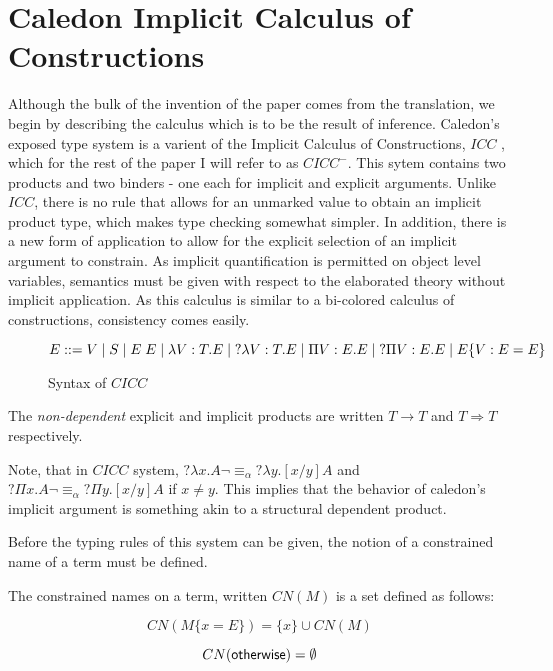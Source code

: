 \section{Caledon Implicit Calculus of Constructions}

Although the bulk of the invention of the paper comes from the translation, 
we begin by describing the calculus which is to be the result of inference.
Caledon's exposed type system is a varient of the Implicit Calculus of Constructions, $ICC$ \citep{miquel2001implicit}, 
which for the rest of the paper I will refer to as $CICC^{-}$.  
This sytem contains two products and two binders - one each for implicit and explicit arguments. 
Unlike $ICC$, there is no rule that allows for an unmarked value to obtain an implicit product type, which
makes type checking somewhat simpler.  
In addition, there is a new form of application to allow for the explicit
selection of an implicit argument to constrain. 
As implicit quantification is permitted on object level variables, semantics must be given with respect to 
the elaborated theory without implicit application.  As this calculus is similar to a bi-colored calculus of constructions, consistency comes easily.

\begin{figure}[H]
\[ 
E ::= 
V 
\; | \; S 
\; | \; E\;E 
\; | \; \lambda V : T. E 
\; | \; ?\lambda V : T. E 
\; | \; \Pi V : E . E 
\; | \; ?\Pi V : E . E 
\; | \; E \{ V : E = E \}
\]

\caption{Syntax of $CICC$}
\label{cicc:syntax}
\end{figure}

The \textit{non-dependent} explicit and implicit products are written $T \rightarrow T$ 
and $T \Rightarrow T$ respectively.

Note, that in $CICC$ system, $?\lambda x . A \neg\equiv_\alpha ?\lambda y . [x / y] A$ 
and $?\Pi x . A \neg\equiv_\alpha ?\Pi y . [x / y] A$  if $x \neq y$.  
This implies that the behavior of caledon's implicit argument is something akin to a structural dependent product.  

Before the typing rules of this system can be given, the notion of a constrained name of a term must be defined.

\begin{definition}
The constrained names on a term, written $CN(M)$ is a set defined as follows:

\[
CN(M \{ x = E \}) = \{ x \} \cup CN(M)
\]

\[ 
CN(\mathsf{otherwise}) = \emptyset
\]

\end{definition}

